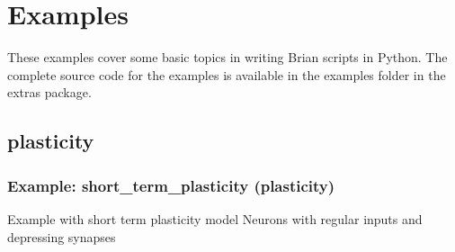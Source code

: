 \documentclass[letterpaper,10pt,english]{manual}
\begin{document}
\resetcurrentobjects
\hypertarget{--doc-examples}{}

\section{Examples}

These examples cover some basic topics in writing Brian scripts in Python. The
complete source code for the examples is available in the examples folder
in the extras package.


\subsection{plasticity}

\resetcurrentobjects
\hypertarget{--doc-examples-plasticity_short_term_plasticity}{}

\hypertarget{index-78}{}\subsubsection{Example: short\_term\_plasticity (plasticity)}

Example with short term plasticity model
Neurons with regular inputs and depressing synapses
\end{document}
